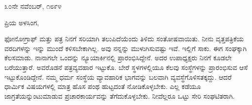 \begin{flushright}
೩೦ನೇ ನವೆಂಬರ್, ೧೮೯೪
\end{flushright}

\noindent
ಪ್ರಿಯ ಅಳಸಿಂಗ,

ಫೋನೋಗ್ರಾಫ್ ಮತ್ತು ಪತ್ರ ನಿನಗೆ ಸರಿಯಾಗಿ ತಲುಪಿದೆಯೆಂದು ತಿಳಿದು ಸಂತೋಷವಾಯಿತು. ನೀನು ವೃತ್ತಪತ್ರಿಕೆಯ ವರದಿಗಳನ್ನು ಇನ್ನು ಮುಂದೆ ಕಳಿಸಬೇಕಾಗಿಲ್ಲ. ಅವು ನನ್ನನ್ನು ಮುಳುಗಿಸುವಷ್ಟು ಇವೆ. ಇಲ್ಲಿಗೆ ಸಾಕು. ಈಗ ಸಂಘಕ್ಕಾಗಿ ಕೆಲಸಮಾಡು. ನಾನಾಗಲೇ ಒಂದನ್ನು ನ್ಯೂಯಾರ್ಕಿನಲ್ಲಿ ಪ್ರಾರಂಭಿಸಿದ್ದೇನೆ. ಅದರ ಉಪಾಧ್ಯಕ್ಷರು ನಿನಗೆ ಕೂಡಲೇ ಬರೆಯುತ್ತಾರೆ. ಅವರೊಡನೆ ಪತ್ರವ್ಯವಹಾರ ಇಟ್ಟುಕೊ. ಬೇರೆ ಸ್ಥಳಗಳಲ್ಲಿಯೂ ಕೆಲವು ಸಂಸ್ಥೆಗಳನ್ನು ಪ್ರಾರಂಭಿಸುವ ಆಸೆ ಇಟ್ಟುಕೊಂಡಿದ್ದೇನೆ. ನಮ್ಮ ಧರ್ಮ ಸಂಸ್ಥೆಯ ವ್ಯಾವಹಾರಿಕ ಭಾಗವನ್ನು ಬಲವಾಗಿ ವ್ಯವಸ್ಥೆಗೊಳಿಸತಕ್ಕದ್ದು. ಆದರೆ ಧಾರ್ಮಿಕ ವಿಷಯಗಳಲ್ಲಿ ಮಾತ್ರ ಹೊಸ ಪಂಥ ಹುಟ್ಟದಂತೆ ನೋಡಿಕೊಳ್ಳಬೇಕು. ಎಲ್ಲ ಕಡೆಯೂ ಜಾಗ್ರತೆಯನ್ನುಂಟುಮಾಡುವ ಪ್ರಚಾರಕಾರ್ಯವನ್ನು ತೆಗೆದುಕೊಳ್ಳಬೇಕು. ನೀವೆಲ್ಲರೂ ಒಟ್ಟು ಸೇರಿ ಸಂಘಟಿತರಾಗಿ.

